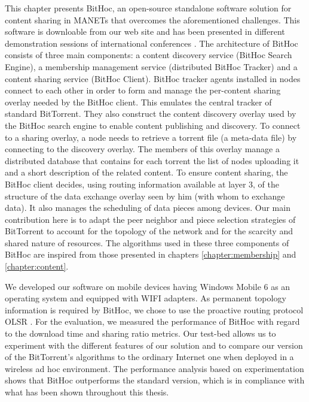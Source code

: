 This chapter presents BitHoc, an open-source standalone software solution for content sharing in MANETs that overcomes the aforementioned challenges. This software is downloable from our web site \cite{Bithoc} and has been presented in different demonstration sessions of international conferences \cite{MOBIHELD}\cite{PERCOM}. The architecture of BitHoc consists of three main components: a content discovery service (BitHoc Search Engine), a membership management service (distributed BitHoc Tracker) and a content sharing service (BitHoc Client). BitHoc tracker agents installed in nodes connect to each other in order to form and manage the per-content sharing overlay needed by the BitHoc client. This emulates the central tracker of standard BitTorrent. They also construct the content discovery overlay used by the BitHoc search engine to enable content publishing and discovery. To connect to a sharing overlay, a node needs to retrieve a torrent file (a meta-data file) by connecting to the discovery overlay. The members of this overlay manage a distributed database that contains for each torrent the list of nodes uploading it and a short description of the related content. To ensure content sharing, the BitHoc client decides, using routing information available at layer 3, of the structure of the data exchange overlay seen by him (with whom to exchange data). It also manages the scheduling of data pieces among devices. Our main contribution here is to adapt the peer neighbor and piece selection strategies of BitTorrent to account for the topology of the network and for the scarcity and shared nature of resources. The algorithms used in these three components of BitHoc are inspired from those presented in chapters \ref{chapter:membership} and \ref{chapter:content}.

We developed our software on mobile devices having Windows Mobile 6 \cite{WM6} as an operating system and equipped with WIFI adapters. As permanent topology information is required by BitHoc, we chose to use the proactive routing protocol OLSR \cite{MOLSR}. For the evaluation, we measured the performance of BitHoc with regard to the download time and sharing ratio metrics. Our test-bed allows us to experiment with the different features of our solution and to compare our version of the BitTorrent's algorithms to the ordinary Internet one when deployed in a wireless ad hoc environment. The performance analysis based on experimentation shows that BitHoc outperforms the standard version, which is in compliance with what has been shown throughout this thesis. 

